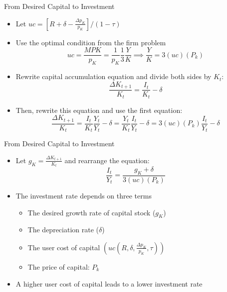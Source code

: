 \documentclass[aspectratio=1610]{beamer}
\begin{document}
\begin{frame}[wide]{From Desired Capital to Investment}
	\begin{itemize}
		\item 	Let $uc =  \left[R +\delta -\frac{\Delta p_K}{p_K}\right] / (1-\tau)$ 
		\item Use the optimal condition from the firm problem
		\[uc =  \frac{MPK}{p_K} = \frac{1}{p_K}\frac{1}{3} \frac{Y}{K} \implies \frac{Y}{K} = 3(uc)(P_k) \]
		\item Rewrite capital accumulation equation and divide both sides by $K_t$:
		\[\frac{\Delta K_{t+1}}{K_t} = \frac{I_t}{K_t} - \delta\]
		\item Then, rewrite this equation and use the first equation:
		\[\frac{\Delta K_{t+1}}{K_t} = \frac{I_t}{K_t} \frac{Y_t}{Y_t} - \delta = \frac{Y_t}{K_t} \frac{I_t}{Y_t} - \delta = 3(uc)(P_k) \frac{ I_t}{Y_t} -\delta \]
	\end{itemize}
\end{frame}

\begin{frame}[wide]{From Desired Capital to Investment}
	\begin{itemize}
		\item Let $g_K = \frac{\Delta K_{t+1}}{K_t}$ and rearrange the equation:
		\[\frac{I_t}{Y_t} = \frac{g_K + \delta}{3(uc)(P_k)}\]
		\item The investment rate depends on three terms
		\begin{itemize}
			\item The desired growth rate of capital stock ($g_K$)
			\item The depreciation rate ($\delta$)
			\item The user cost of capital $\left(uc(R, \delta, \frac{\Delta p_K}{p_K}, \tau)\right)$
			\item The price of capital: $P_k$
		\end{itemize}
		\item A higher user cost of capital leads to a lower investment rate
	\end{itemize}
\end{frame}
\end{document}
